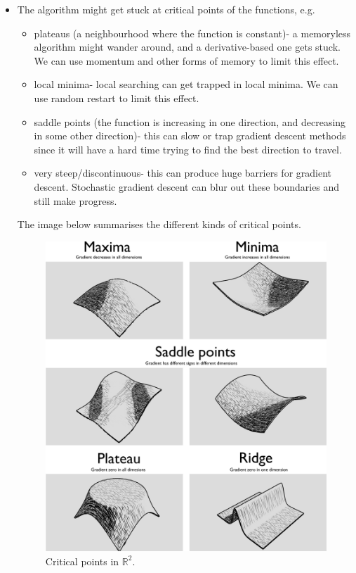 \documentclass[a4paper, openany]{memoir}
\begin{document}
\begin{itemize}
    \item The algorithm might get stuck at critical points of the functions, e.g.
    \begin{itemize}
        \item plateaus (a neighbourhood where the function is constant)- a memoryless algorithm might wander around, and a derivative-based one gets stuck. We can use momentum and other forms of memory to limit this effect.
        \item local minima- local searching can get trapped in local minima. We can use random restart to limit this effect.
        \item saddle points (the function is increasing in one direction, and decreasing in some other direction)- this can slow or trap gradient descent methods since it will have a hard time trying to find the best direction to travel.
        \item very steep/discontinuous- this can produce huge barriers for gradient descent. Stochastic gradient descent can blur out these boundaries and still make progress.
    \end{itemize}
    The image below summarises the different kinds of critical points.
    \begin{figure}[H]
        \centering
        \includegraphics[scale=0.15]{src/4.23 2D stationary points.png}
        \caption{Critical points in $\mathbb{R}^2$.}
    \end{figure}
\end{itemize}
\newpage
\end{document}
